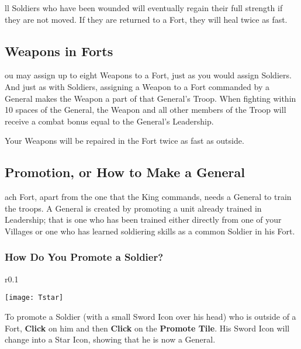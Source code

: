 ll Soldiers who have been wounded will eventually regain their full strength if they are not moved. If they are returned to a Fort, they will heal twice as fast.

\subsection{\textsf{Weapons in Forts}}


ou may assign up to eight Weapons to a Fort, just as you would assign Soldiers. And just as with Soldiers, assigning a Weapon to a Fort commanded by a General makes the Weapon a part of that General’s Troop. When fighting within 10 spaces of the General, the Weapon and all other members of the Troop will receive a combat bonus equal to the General’s Leadership.

Your Weapons will be repaired in the Fort twice as fast as outside.

\subsection{\textsf{Promotion, or How to Make a General}}


ach Fort, apart from the one that the King commands, needs a General to train the troops. A General is created by promoting a unit already trained in Leadership; that is one who has been trained either directly from one of your Villages or one who has learned soldiering skills as a common Soldier in his Fort.

\subsubsection{\textsf{How Do You Promote a Soldier?}}

\begin{wrapfigure}{r}{0.1\textwidth}
    \vspace{-20pt}
    \begin{center}
        \texttt{[image: Tstar]}
    \end{center}
    \vspace{-20pt}
\end{wrapfigure}

To promote a Soldier (with a small Sword Icon over his head) who is outside of a Fort, \textbf{Click} on him and then \textbf{Click} on the \textbf{Promote Tile}. His Sword Icon will change into a Star Icon, showing that he is now a General.

